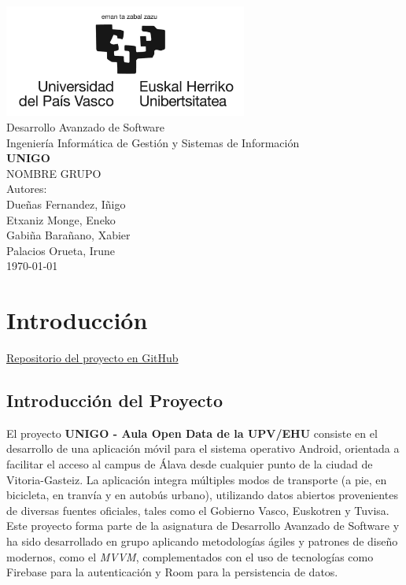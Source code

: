 \documentclass[a4paper,12pt]{report}
\begin{document}
  \begin{titlepage}
      \centering
      \includegraphics[width=0.6\textwidth]{img/logo.jpg}\\
      \vspace{1cm}
      \LARGE Desarrollo Avanzado de Software\\
      \vspace{0.5cm}
      \Large Ingeniería Informática de Gestión y Sistemas de Información\\
      \vspace{3cm}
      \vspace{0.5cm}
      \Huge \textbf{UNIGO}\\
      \huge NOMBRE GRUPO\\
      \vspace{2.5cm}
      \Large Autores:\\
      \vspace{0.2cm}
      \large Dueñas Fernandez, Iñigo\\
      \large Etxaniz Monge, Eneko\\
      \large Gabiña Barañano, Xabier\\
      \large Palacios Orueta, Irune\\
      \vfill
      \today
  \end{titlepage}
  \tableofcontents
  \listoffigures
  \chapter{Introducción}
    \begin{center}
      \href{https://github.com/Xabierland/UNIGO}{Repositorio del proyecto en GitHub}
    \end{center}
    \section{Introducción del Proyecto}
      El proyecto \textbf{UNIGO - Aula Open Data de la UPV/EHU} consiste en el desarrollo de una aplicación móvil para el sistema operativo Android, orientada a facilitar el acceso al campus de Álava desde cualquier punto de la ciudad de Vitoria-Gasteiz. La aplicación integra múltiples modos de transporte (a pie, en bicicleta, en tranvía y en autobús urbano), utilizando datos abiertos provenientes de diversas fuentes oficiales, tales como el Gobierno Vasco, Euskotren y Tuvisa. Este proyecto forma parte de la asignatura de Desarrollo Avanzado de Software y ha sido desarrollado en grupo aplicando metodologías ágiles y patrones de diseño modernos, como el \textit{MVVM}, complementados con el uso de tecnologías como Firebase para la autenticación y Room para la persistencia de datos.
\end{document}
